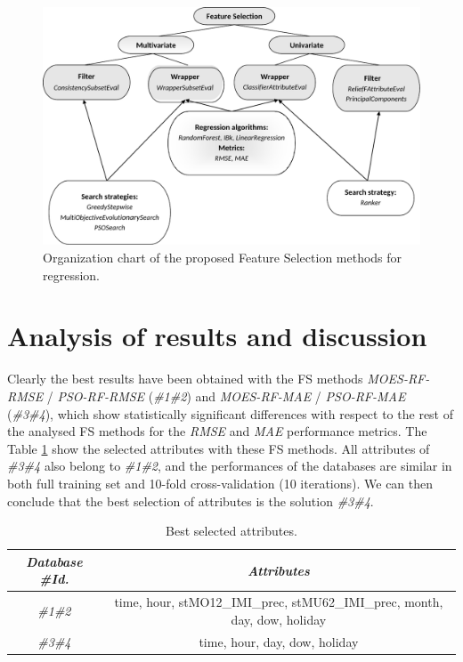 \documentclass[journal,twoside,web]{ieeecolor}
\begin{document}
\begin{figure} \label{fig:dos}
\centerline{\includegraphics[scale=0.7]{./figs/FS-i.pdf}}
\caption{Organization chart of the proposed Feature Selection methods for regression.}\label{fig:FSmethods}
\end{figure}

\section{Analysis of results and discussion}

Clearly the best results have been obtained with the FS methods \textit{MOES-RF-RMSE} / \textit{PSO-RF-RMSE} (\textit{\#1\#2}) and \textit{MOES-RF-MAE} / \textit{PSO-RF-MAE} (\textit{\#3\#4}), which show statistically significant differences with respect to the rest of the analysed FS methods for the \textit{RMSE} and \textit{MAE} performance metrics. The Table \ref{SA} show the selected attributes with these FS methods. All attributes of \textit{\#3\#4} also belong to \textit{\#1\#2}, and the performances of the databases are similar  in both full training set and 10-fold cross-validation (10 iterations).
We can then conclude that the best selection of attributes is the solution \textit{\#3\#4}.

\begin{table}[h]
	\begin{center}
			\footnotesize{\begin{tabular}{cc}\hline
		\textit{\textbf{Database \#Id.}} & \textit{\textbf{Attributes}} \\\hline
		\textit{\#1\#2} & time, hour, stMO12\_IMI\_prec, stMU62\_IMI\_prec, month, day, dow, holiday \\
		
		\textit{\#3\#4} & time, hour, day, dow, holiday \\\hline	
	\end{tabular}}
	\end{center}
	\caption{Best selected attributes.}
	\label{SA}
\end{table}
\end{document}
